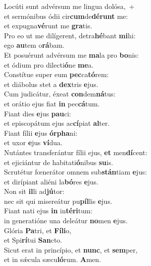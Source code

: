 \evenverse Locúti sunt advérsum me lingua dolósa,~+\\\evenverse  et sermónibus ódii cir\textbf{cum}de\textbf{dé}\textbf{runt} me:~\*\\
\evenverse et expugna\textbf{vé}runt me \textbf{gra}tis.\\
\oddverse Pro eo ut me dilígerent, detra\textbf{hé}bant \textbf{mi}hi:~\*\\
\oddverse ego \textbf{au}tem o\textbf{rá}bam.\\
\evenverse Et posuérunt advérsum me \textbf{ma}la pro \textbf{bo}nis:~\*\\
\evenverse et ódium pro dilecti\textbf{ó}ne \textbf{me}a.\\
\oddverse Constítue super eum \textbf{pec}ca\textbf{tó}rem:~\*\\
\oddverse et diábolus stet a \textbf{dex}tris \textbf{e}jus.\\
\evenverse Cum judicátur, éxeat \textbf{con}dem\textbf{ná}tus:~\*\\
\evenverse et orátio ejus fiat \textbf{in} pec\textbf{cá}tum.\\
\oddverse Fiant dies \textbf{e}jus \textbf{pau}ci:~\*\\
\oddverse et episcopátum ejus ac\textbf{cí}piat \textbf{al}ter.\\
\evenverse Fiant fílii \textbf{e}jus \textbf{ór}\textbf{pha}ni:~\*\\
\evenverse et uxor \textbf{e}jus \textbf{ví}dua.\\
\oddverse Nutántes transferántur fílii ejus, \textbf{et} men\textbf{dí}cent:~\*\\
\oddverse et ejiciántur de habitati\textbf{ó}nibus \textbf{su}is.\\
\evenverse Scrutétur fœnerátor omnem sub\textbf{stán}tiam \textbf{e}jus:~\*\\
\evenverse et dirípiant aliéni la\textbf{bó}res \textbf{e}jus.\\
\oddverse Non sit \textbf{il}li ad\textbf{jú}tor:~\*\\
\oddverse nec sit qui misereátur pu\textbf{píl}lis \textbf{e}jus.\\
\evenverse Fiant nati ejus \textbf{in} in\textbf{té}\textbf{ri}tum:~\*\\
\evenverse in generatióne una deleátur \textbf{no}men \textbf{e}jus.\\
\oddverse Glória \textbf{Pa}tri, et \textbf{Fí}\textbf{li}o,~\*\\
\oddverse et Spi\textbf{rí}tui \textbf{San}cto.\\
\evenverse Sicut erat in princípio, et \textbf{nunc}, et \textbf{sem}per,~\*\\
\evenverse et in sǽcula sæcu\textbf{ló}rum. \textbf{A}men.\\
